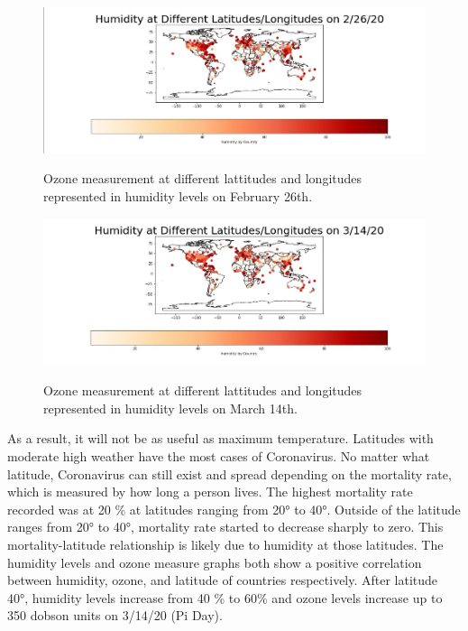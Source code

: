 \documentclass[10pt,journal,compsoc]{IEEEtran}
\begin{document}
{{\begin{figure}[!htbp] %
	\includegraphics[scale=0.3]{humidity-feb-26.png}\\
	\centering
	\caption{Ozone measurement at different lattitudes and longitudes represented in humidity levels on February 26th.}
	\label{LP-COVID-Humidity February 26th}
\end{figure}

\begin{figure}[!htbp] %
	\includegraphics[scale=0.3]{humidity-mar-14.png}\\
	\centering
	\caption {Ozone measurement at different lattitudes and longitudes represented in humidity levels on March 14th.}
	\label{LP-COVID-Humidity March 14th}
\end{figure}

	As a result, it will not be as useful as maximum temperature. Latitudes with moderate high weather have the most cases of Coronavirus. No matter what latitude, Coronavirus can still exist and spread depending on the mortality rate, which is measured by how long a person lives. The highest mortality rate recorded was at 20 \% at latitudes ranging from 20° to 40°. Outside of the latitude ranges from 20° to 40°, mortality rate started to decrease sharply to zero. This mortality-latitude relationship is likely due to humidity at those latitudes. The humidity levels and ozone measure graphs both show a positive correlation between humidity, ozone, and latitude of countries respectively. After latitude 40°, humidity levels increase from 40 \% to 60\% and ozone levels increase up to 350 dobson units on 3/14/20 (Pi Day).

}}
\end{document}
